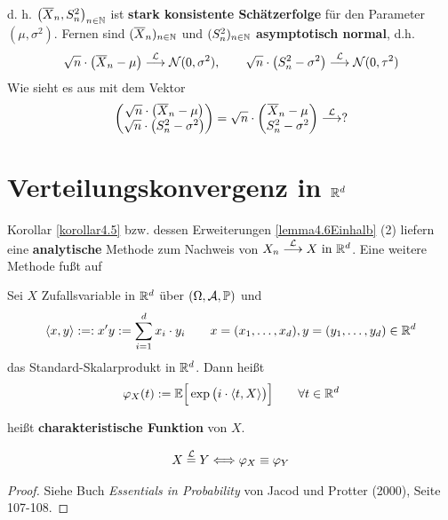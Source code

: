 d. h. $\big(\overline{X}_n,S_n^2\big)_{n\in\mathbb{N}}$ ist \textbf{stark konsistente Schätzerfolge} für den Parameter $(\mu,\sigma^2)$.
Fernen sind $(\overline{X}_n)_{n\in\mathbb{N}}$ und $(S_n^2)_{n\in\mathbb{N}}$ \textbf{asymptotisch normal}, d.h.
\begin{align*}
\sqrt{n}\cdot\big(\overline{X}_n-\mu\big)\stackrel{\mathcal{L}}{\longrightarrow}\mathcal{N}(0,\sigma^2),\qquad
\sqrt{n}\cdot\big(S_n^2-\sigma^2\big)\stackrel{\mathcal{L}}{\longrightarrow}\mathcal{N}(0,\tau^2)
\end{align*}
Wie sieht es aus mit dem Vektor 
\begin{align*}
\begin{pmatrix}
\sqrt{n}\cdot\big(\overline{X}_n-\mu\big)\\
\sqrt{n}\cdot\big(S_n^2-\sigma^2\big)
\end{pmatrix}
=\sqrt{n}\cdot\begin{pmatrix}
\overline{X}_n-\mu\\
S_n^2-\sigma^2
\end{pmatrix}
\stackrel{\mathcal{L}}{\longrightarrow}?
\end{align*}

\section{Verteilungskonvergenz in \texorpdfstring{$\mathbb{R}^d$}{R\textasciicircum d}}
Korollar \ref{korollar4.5} bzw. dessen Erweiterungen \ref{lemma4.6Einhalb} (2) liefern eine \textbf{analytische} Methode zum Nachweis von $X_n\stackrel{\mathcal{L}}{\longrightarrow}X\text{ in }\mathbb{R}^d$. Eine weitere Methode fußt auf

\begin{definition}\label{def5.1}
Sei $X$ Zufallsvariable in $\mathbb{R}^d$ über $(\Omega,\mathcal{A},\mathbb{P})$ und
\begin{align*}
\langle x,y\rangle:=:x'y:=\sum\limits_{i=1}^d x_i\cdot y_i\qquad x=(x_1,\ldots,x_d),y=(y_1,\ldots,y_d)\in\mathbb{R}^d
\end{align*}
das Standard-Skalarprodukt in $\mathbb{R}^d$. Dann heißt
\begin{align*}
\varphi_X(t):=\mathbb{E}\Big[\exp\big(i\cdot\langle t,X\rangle\big)\Big]\qquad\forall t\in\mathbb{R}^d
\end{align*}
\end{definition}
heißt \textbf{charakteristische Funktion} von $X$.

\begin{satz}[Eindeutigkeitssatz]\label{satz5.2Eindeutigkeitssatz}
\begin{align*}
X\stackrel{\mathcal{L}}{=} Y\Longleftrightarrow\varphi_X\equiv\varphi_Y
\end{align*}
\end{satz}
\begin{proof}
Siehe Buch \textit{Essentials in Probability} von Jacod und Protter (2000), Seite 107-108.
\end{proof}

